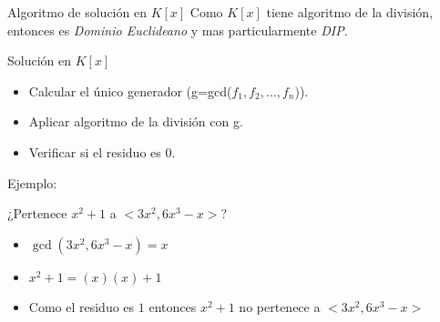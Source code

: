 \documentclass{beamer}
\begin{document}
\begin{frame}{Algoritmo de solución en $K[x]$}
	Como $K[x]$ tiene algoritmo de la división, entonces es \emph{Dominio Euclideano} y mas particularmente \emph{DIP}.
	\begin{block}{Solución en $K[x]$}
		\begin{itemize}
			\item Calcular el único generador (g=gcd($f_1,f_2,\ldots,f_n$)).
			\item Aplicar algoritmo de la división con g.
			\item Verificar si el residuo es $0$.
		\end{itemize}
	\end{block}

	\pause
	Ejemplo:

	¿Pertenece $x^2+1$ a $<3x^2, 6x^3-x>$?
	\begin{itemize}
		\item $\gcd(3x^2, 6x^3-x) = x$
		\item $x^2+1 = (x)(x)+1$
		\item Como el residuo es $1$ entonces $x^2+1$ no pertenece a $<3x^2, 6x^3-x>$
	\end{itemize}
\end{frame}
\end{document}
